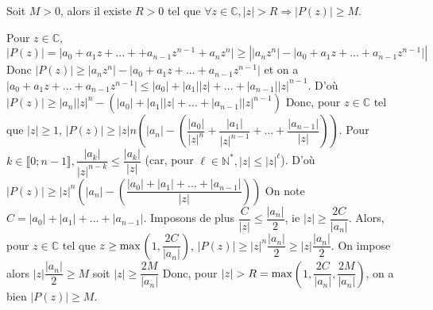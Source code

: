 \documentclass[12pt,a4paper]{report}
\begin{document}
\begin{lemme}{}{}
Soit $M>0$, alors il existe $R>0$ tel que $\forall z \in \mathbb{C}, \lvert z \rvert > R \Longrightarrow \lvert P(z) \rvert \geq M$.
\end{lemme}

\begin{demo}
Pour $z \in \mathbb{C}$, $\lvert P(z) \rvert = \lvert a_0 + a_1z + ... + + a_{n-1}z^{n-1} + a_n z^n \rvert \geq \left \lvert \lvert a_n z^n \rvert - \lvert a_0 + a_1z+...+a_{n-1}z^{n-1} \rvert \right \rvert$
\newline Donc $\lvert P(z) \rvert \geq \lvert a_n z^n \rvert - \lvert a_0 + a_1z+...+a_{n-1}z^{n-1} \rvert$
\newline et on a $\lvert a_0 + a_1z+...+a_{n-1}z^{n-1} \rvert  \leq \lvert a_0 \rvert + \lvert a_1 \rvert \lvert z \rvert + ... + \lvert a_{n-1} \rvert \lvert z\rvert ^{n-1}$.
\newline D'où $\lvert P(z) \rvert  \geq \lvert a_n \rvert \lvert z \rvert ^n - \left(\lvert a_0 \rvert + \lvert a_1 \rvert  \lvert z \rvert + ...+ \lvert a_{n-1} \rvert \lvert z \rvert ^{n-1} \right)$
\newline Donc, pour $z \in \mathbb{C}$ tel que $\lvert z \rvert \geq 1$, $\lvert P(z) \rvert \geq \lvert z \rvert n \left(\lvert a_n \rvert - \left( \dfrac{\lvert a_0 \rvert}{\lvert z \rvert ^n} + \dfrac{\lvert a_1 \rvert}{\lvert z \rvert ^{n-1}} + ... + \dfrac{\lvert a_{n-1} \rvert}{\lvert z \rvert}\right) \right)$.
\newline \newline Pour $k \in \llbracket 0 ; n-1 \rrbracket, \dfrac{\lvert a_k \rvert }{\lvert z \rvert ^{n-k}} \leq \dfrac{\lvert a_k \rvert}{\lvert z \rvert}$ (car, pour $\ell \in \mathbb{N}^*, \lvert z \rvert \leq \lvert z \rvert ^\ell$).
\newline D'où $\lvert P(z) \rvert \geq \lvert z \rvert ^n \left( \lvert a_n \rvert - \left(\dfrac{\lvert a_0 \rvert + \lvert a_1 \rvert + ... + \lvert a_{n-1} \rvert}{\lvert z \rvert} \right)\right)$
\newline \newline On note $C = \lvert a_0 \rvert + \lvert a_1 \rvert + ... + \lvert a_{n-1} \rvert$. Imposons de plus $\dfrac{C}{\lvert z \rvert} \leq \dfrac{\lvert a_n \rvert}{2}$, ie $\lvert z \rvert \geq \dfrac{2C}{\lvert a_n \rvert}$.
\newline \newline Alors, pour $z \in \mathbb{C}$ tel que $z \geq \rm{max}$$\left(1,\dfrac{2C}{\lvert a_n \rvert}\right)$, $\lvert P(z) \rvert \geq \lvert z \rvert ^n \dfrac{\lvert a_n \rvert}{2} \geq \lvert z \rvert \dfrac{\lvert a_n \rvert}{2}$.
\newline \newline On impose alors $\lvert z \rvert \dfrac{\lvert a_n \rvert}{2} \geq M$ soit $\lvert z \rvert \geq \dfrac{2M}{\lvert a_n \rvert}$
\newline \newline Donc, pour $\lvert z \rvert > R = \rm{max}$$\left(1,\dfrac{2C}{\lvert a_n \rvert},\dfrac{2M}{\lvert a_n \rvert}\right)$, on a bien $\lvert P(z) \rvert \geq M$.
\end{demo}
\end{document}
